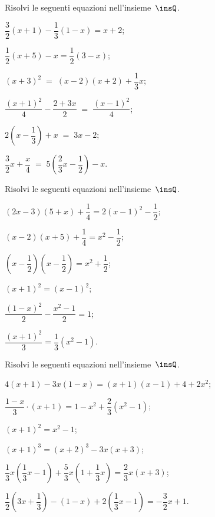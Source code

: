 \begin{esercizio}[\Ast]
\label{ese:13.36}
Risolvi le seguenti equazioni nell'insieme~$\insQ$.
\begin{multicols}{2}
\begin{enumeratea}
\spazielenx
 \item $\dfrac{3}{2}(x+1)-\dfrac{1}{3}(1-x)=x+2$;
 \item $\dfrac{1}{2}(x+5)-x=\dfrac{1}{2}(3-x)$;
 \item $(x+3)^{2}\;=\;(x-2)(x+2)+\dfrac{1}{3}x$;
 \item $\dfrac{(x+1)^{2}}{4}-\dfrac{2+3x}{2}\;=\;\dfrac{(x-1)^{2}}{4}$;
 \item $2\left(x-\dfrac{1}{3}\right)+x\;=\;3x-2$;
 \item $\dfrac{3}{2}x+\dfrac{x}{4}\;=\;5\left(\dfrac{2}{3}x-\dfrac{1}{2}\right)-x$.
\end{enumeratea}
\end{multicols}
\end{esercizio}

\begin{esercizio}[\Ast]
\label{ese:13.37}
Risolvi le seguenti equazioni nell'insieme~$\insQ$.
\begin{multicols}{2}
\begin{enumeratea}
\spazielenx
 \item $(2x-3)(5+x)+\dfrac{1}{4}=2(x-1)^{2}-\dfrac{1}{2}$;
 \item $(x-2)(x+5)+\dfrac{1}{4}=x^{2}-\dfrac{1}{2}$;
 \item $\left(x-\dfrac{1}{2}\right)\left(x-\dfrac{1}{2}\right)=x^{2}+\dfrac{1}{2}$;
 \item $(x+1)^{2}=(x-1)^{2}$;
 \item $\dfrac{(1-x)^{2}}{2}-\dfrac{x^{2}-1}{2}=1$;
 \item $\dfrac{(x+1)^{2}}{3}=\dfrac{1}{3}(x^{2}-1)$.
\end{enumeratea}
\end{multicols}
\end{esercizio}

\begin{esercizio}[\Ast]
\label{ese:13.38}
Risolvi le seguenti equazioni nell'insieme~$\insQ$.
\begin{enumeratea}
\spazielenx
 \item $4(x+1)-3x(1-x)=(x+1)(x-1)+4+2x^{2}$;
 \item $\dfrac{1-x}{3}\cdot (x+1)=1-x^{2}+\dfrac{2}{3}\left(x^{2}-1\right)$;
 \item $(x+1)^{2}=x^{2}-1$;
 \item $(x+1)^{3}=(x+2)^{3}-3x(x+3)$;
 \item $\dfrac{1}{3}x\left(\dfrac{1}{3}x-1\right)+\dfrac{5}{3}x\left(1+\dfrac{1}{3}x\right)=\dfrac{2}{3}x(x+3)$;
 \item $\dfrac{1}{2}\left(3x+\dfrac{1}{3}\right)-(1-x)+2\left(\dfrac{1}{3}x-1\right)=-{\dfrac{3}{2}}x+1$.
\end{enumeratea}
\end{esercizio}

